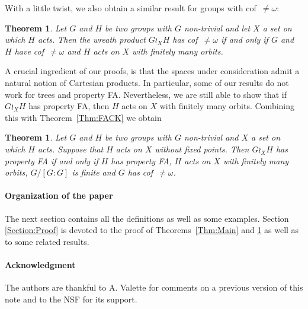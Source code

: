\documentclass[a4paper]{article}
\newtheorem{thm}[lem]{Theorem}
\theoremstyle{definition}
\begin{document}
%
%
With a little twist, we also obtain a similar result for groups with cof~$\neq\omega$:
\begin{thm}\label{Thm:UncCoun}
Let $G$ and $H$ be two groups with $G$ non-trivial and let $X$ a set on which $H$ acts. Then the wreath product $G \wr_X H$ has cof~$\neq\omega$ if and only if $G$ and $H$ have cof~$\neq\omega$ and $H$ acts on $X$ with finitely many orbits.
\end{thm}
%
%
A crucial ingredient of our proofs, is that the spaces under consideration admit a natural notion of Cartesian products.
In particular, some of our results do not work for trees and property FA.
Nevertheless, we are still able to show that if $G\wr_XH$ has property FA, then $H$ acts on $X$ with finitely many orbits. Combining this with Theorem~\ref{Thm:FACK} we obtain 
\begin{thm}\label{Thm:FAFiniteOrbits}
Let $G$ and $H$ be two groups with $G$ non-trivial and $X$ a set on which $H$ acts. Suppose that $H$ acts on $X$ without fixed points.
Then $G\wr_XH$ has property FA if and only if $H$ has property FA, $H$ acts on $X$ with finitely many orbits, $G/[G:G]$ is finite and $G$ has cof~$\neq\omega$.
\end{thm}
%
%
%
%
\paragraph{Organization of the paper}
The next section contains all the definitions as well as some examples. Section \ref{Section:Proof} is devoted to the proof of Theorems~\ref{Thm:Main} and \ref{Thm:UncCoun} as well as to some related results.
%
%
%
\paragraph{Acknowledgment}
The authors are thankful to A. Valette for comments on a previous version of this note and to the NSF for its support.
%
%
%
\end{document}
